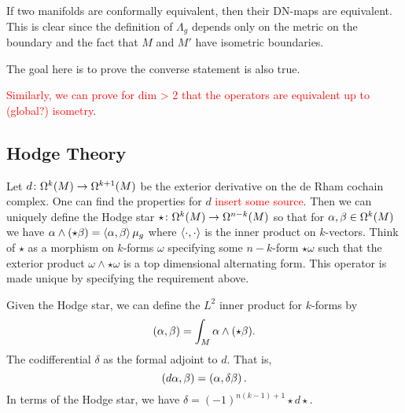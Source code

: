 \documentclass[12pt]{article}
\begin{document}
\begin{remark}
	If two manifolds are conformally equivalent, then their DN-maps are equivalent.  This is clear since the definition of $\Lambda_g$ depends only on the metric on the boundary and the fact that $M$ and $M'$ have isometric boundaries.
\end{remark}

\begin{remark}
	The goal here is to prove the converse statement is also true.
\end{remark}

\begin{remark}
\textcolor{red}{Similarly, we can prove for dim > 2 that the operators are equivalent up to (global?) isometry}.
\end{remark}

\subsection{Hodge Theory}

Let $d \colon \Omega_{}^{k}(M) \to \Omega_{}^{k+1}(M)$ be the exterior derivative on the de Rham cochain complex.  One can find the properties for $d$ \textcolor{red}{insert some source}.  Then we can uniquely define the Hodge star $\star \colon \Omega_{}^{k}(M) \to \Omega_{}^{n-k}(M)$ so that for $\alpha,\beta \in \Omega_{}^{k}(M)$ we have $\alpha \wedge (\star \beta) = \left\langle \alpha, \beta\right\rangle \mu_g$ where $\left\langle \cdot, \cdot\right\rangle$ is the inner product on $k$-vectors. Think of $\star$ as a morphism on $k$-forms $\omega$ specifying some $n-k$-form $\star \omega$ such that the  exterior product $\omega \wedge \star \omega$ is a top dimensional alternating form.  This operator is made unique by specifying the requirement above.

Given the Hodge star, we can define the $L^2$ inner product for $k$-forms by
\[
\left( \alpha,\beta \right) = \int_M \alpha \wedge (\star \beta).
\]
The codifferential $\delta$ as the formal adjoint to $d$. That is,
\[
\left( d\alpha,\beta \right) = \left( \alpha,\delta \beta \right).
\]
In terms of the Hodge star, we have $\delta = (-1)^{n(k-1)+1}\star d \star$.  
\end{document}
